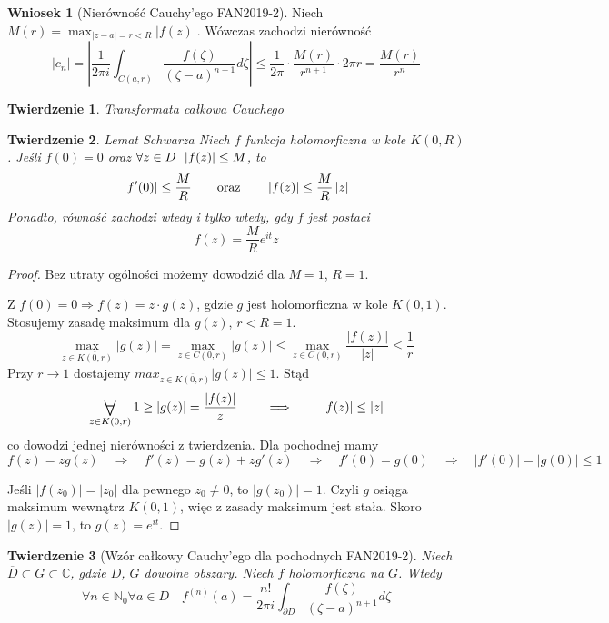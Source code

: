 \documentclass{article}
\theoremstyle{plain}
\newtheorem*{theorem}{Twierdzenie}
\theoremstyle{definition}
\newtheorem*{corollary}{Wniosek}
\theoremstyle{remark}
\newcommand{\abs}[1]{\left|#1\right|} %
\newcommand{\closure}[1]{\overline{#1}} %
\newcommand{\Forall}[1]{\mathop{\vcenter{\hbox{\LARGE$\forall$}}}\limits_{#1}} %
\begin{document}
\begin{corollary}[Nierówność Cauchy'ego FAN2019-2]
  Niech $ M(r) = \max_{\abs{z-a} = r < R} \abs{f(z)} $. Wówczas zachodzi nierówność
  $$ \abs{c_{n}} = \abs{ \frac{1}{2 \pi i} \int_{C(a, r)} \frac{f(\zeta)}{(\zeta-a)^{n+1}} d\zeta } \leq \frac{1}{2 \pi} \cdot \frac{M(r)}{r^{n+1}} \cdot 2 \pi r = \frac{M(r)}{r^n} $$
\end{corollary}


\begin{theorem}{Transformata całkowa Cauchego}

\end{theorem}

\begin{theorem}{Lemat Schwarza}
Niech $ f $ funkcja holomorficzna w kole $ K(0, R) $.
  Jeśli $ f(0) = 0 $ oraz $ \forall z \in D\enskip\abs{f(z)} \leq M $, to
  $$
    \abs{f'(0)} \leq \frac{M}{R}
    \qquad \textnormal{oraz} \qquad
    \abs{f(z)} \leq \frac{M}{R}\abs{z}
  $$
  Ponadto, równość zachodzi wtedy i tylko wtedy, gdy $ f $ jest postaci
  $$
    f(z) = \frac{M}{R}e^{it}z
  $$
\end{theorem}


\begin{proof}
  Bez utraty ogólności możemy dowodzić dla $ M = 1 $, $ R = 1 $.

  Z $ f(0) = 0 \Rightarrow f(z) = z \cdot g(z) $, gdzie $g$ jest holomorficzna w kole $ K(0,1) $.
  Stosujemy zasadę maksimum dla $ g(z) $, $ r < R = 1 $.
  $$
    \max_{z \in \closure{K(0, r)}} \abs{g(z)} =
    \max_{z \in C(0, r)} \abs{g(z)}
    \leq \max_{z \in C(0, r)} \frac{\abs{f(z)}}{\abs{z}}
    \leq \frac{1}{r}
  $$
  Przy $ r \to 1 $ dostajemy $ max_{z \in \closure{K(0, r)}} \abs{g(z)} \leq 1 $.
  Stąd
  $$
    \Forall{z \in K(0, r)} 1 \geq \abs{g(z)}
    = \frac{\abs{f(z)}}{\abs{z}}
    \qquad \implies \qquad
    \abs{f(z)} \leq \abs{z}
  $$
  co dowodzi jednej nierówności z twierdzenia.
  Dla pochodnej mamy
  $$
    f(z) = zg(z)
    \quad\Rightarrow\quad
    f'(z) = g(z) + zg'(z)
    \quad\Rightarrow\quad
    f'(0) = g(0)
    \quad\Rightarrow\quad
    \abs{f'(0)} = \abs{g(0)}
    \leq 1
  $$

  Jeśli $ \abs{f(z_0)} = \abs{z_0} $ dla pewnego $ z_0 \neq 0 $, to $ \abs{g(z_0)} = 1 $.
  Czyli $ g $ osiąga maksimum wewnątrz $ K(0, 1) $, więc z zasady maksimum jest stała.
  Skoro $ \abs{g(z)} = 1 $, to $ g(z) = e^{it} $.
\end{proof}

\begin{theorem}[Wzór całkowy Cauchy'ego dla pochodnych FAN2019-2]
  Niech $ \closure{D} \subset G \subset \mathbb{C} $, gdzie $ D $, $ G $ dowolne obszary.
  Niech $ f $ holomorficzna na $ G $.
  Wtedy
  $$ \forall{n \in \mathbb{N}_0} \forall{a \in D} \quad f^{(n)}(a) = \frac{n!}{2 \pi i} \int_{\partial D} \frac{f(\zeta)}{(\zeta - a)^{n+1}} d\zeta $$
\end{theorem}
\end{document}
